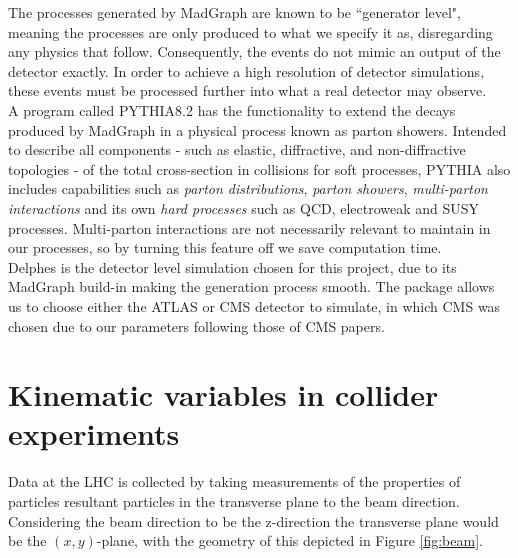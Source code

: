 The processes generated by MadGraph are known to be ``generator level", meaning the processes are only produced to what we specify it as, disregarding any physics that follow. Consequently, the events do not mimic an output of the detector exactly. In order to achieve a high resolution of detector simulations, these events must be processed further into what a real detector may observe. \\

A program called PYTHIA8.2 \cite{sjostrand2015introduction}has the functionality to extend the decays produced by MadGraph in a physical process known as parton showers. Intended to describe all components - such as elastic, diffractive, and non-diffractive topologies - of the total cross-section in collisions for soft processes, PYTHIA also includes capabilities such as \textit{parton distributions}, \textit{parton showers}, \textit{multi-parton interactions} and its own \textit{hard processes} such as QCD, electroweak and SUSY processes. Multi-parton interactions are not necessarily relevant to maintain in our processes, so by turning this feature off we save computation time. \\

Delphes is the detector level simulation chosen for this project, due to its MadGraph build-in making the generation process smooth. The package allows us to choose either the ATLAS or CMS detector to simulate, in which CMS was chosen due to our parameters following those of CMS papers.


\section{Kinematic variables in collider experiments}
Data at the LHC is collected by taking measurements of the properties of particles resultant particles in the transverse plane to the beam direction. Considering the beam direction to be the z-direction the transverse plane would be the $(x,y)$-plane, with the geometry of this depicted in Figure \ref{fig:beam}. \\

